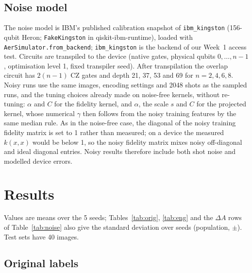 \documentclass[conference]{IEEEtran}
\begin{document}
\subsection{Noise model}\label{sec:noise}
The noise model is IBM's published calibration snapshot of \texttt{ibm\_kingston} (156-qubit Heron; \texttt{FakeKingston} in qiskit-ibm-runtime), loaded with \texttt{AerSimulator.from\_backend}; \texttt{ibm\_kingston} is the backend of our Week~1 access test. Circuits are transpiled to the device (native gates, physical qubits $0,\dots,n-1$, optimisation level 1, fixed transpiler seed). After transpilation the overlap circuit has $2(n-1)$ CZ gates and depth 21, 37, 53 and 69 for $n=2,4,6,8$. Noisy runs use the same images, encoding settings and 2048 shots as the sampled runs, and the tuning choices already made on noise-free kernels, without re-tuning: $\alpha$ and $C$ for the fidelity kernel, and $\alpha$, the scale $s$ and $C$ for the projected kernel, whose numerical $\gamma$ then follows from the noisy training features by the same median rule. As in the noise-free case, the diagonal of the noisy training fidelity matrix is set to 1 rather than measured; on a device the measured $k(x,x)$ would be below 1, so the noisy fidelity matrix mixes noisy off-diagonal and ideal diagonal entries. Noisy results therefore include both shot noise and modelled device errors.

\section{Results}
Values are means over the 5 seeds; Tables~\ref{tab:orig}, \ref{tab:eng} and the $\Delta A$ rows of Table~\ref{tab:noise} also give the standard deviation over seeds (population, $\pm$). Test sets have 40 images.

\subsection{Original labels}
\end{document}

